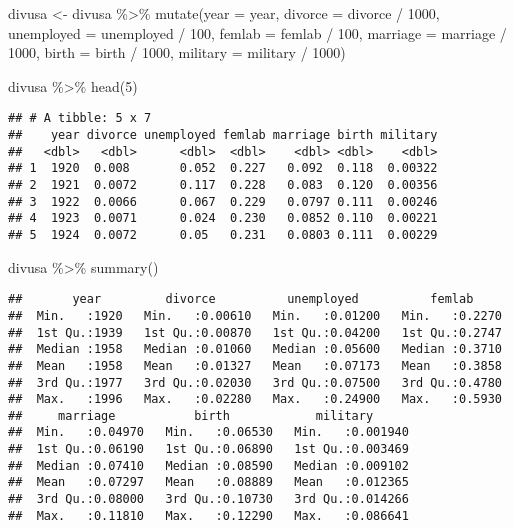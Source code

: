 \documentclass[
]{article}
\newenvironment{Shaded}{\begin{snugshade}}{\end{snugshade}}
\newcommand{\AttributeTok}[1]{\textcolor[rgb]{0.77,0.63,0.00}{#1}}
\newcommand{\DecValTok}[1]{\textcolor[rgb]{0.00,0.00,0.81}{#1}}
\newcommand{\FunctionTok}[1]{\textcolor[rgb]{0.00,0.00,0.00}{#1}}
\newcommand{\NormalTok}[1]{#1}
\newcommand{\OtherTok}[1]{\textcolor[rgb]{0.56,0.35,0.01}{#1}}
\newcommand{\SpecialCharTok}[1]{\textcolor[rgb]{0.00,0.00,0.00}{#1}}
\begin{document}
\begin{Shaded}
\begin{Highlighting}[]
\NormalTok{divusa }\OtherTok{\textless{}{-}}\NormalTok{ divusa }\SpecialCharTok{\%\textgreater{}\%} \FunctionTok{mutate}\NormalTok{(}\AttributeTok{year =}\NormalTok{ year,}
                            \AttributeTok{divorce =}\NormalTok{ divorce }\SpecialCharTok{/} \DecValTok{1000}\NormalTok{,}
                            \AttributeTok{unemployed =}\NormalTok{ unemployed }\SpecialCharTok{/} \DecValTok{100}\NormalTok{,}
                            \AttributeTok{femlab =}\NormalTok{ femlab }\SpecialCharTok{/} \DecValTok{100}\NormalTok{,}
                            \AttributeTok{marriage =}\NormalTok{ marriage }\SpecialCharTok{/} \DecValTok{1000}\NormalTok{,}
                            \AttributeTok{birth =}\NormalTok{ birth }\SpecialCharTok{/} \DecValTok{1000}\NormalTok{,}
                            \AttributeTok{military =}\NormalTok{ military }\SpecialCharTok{/} \DecValTok{1000}\NormalTok{)}

\NormalTok{divusa }\SpecialCharTok{\%\textgreater{}\%} \FunctionTok{head}\NormalTok{(}\DecValTok{5}\NormalTok{)}
\end{Highlighting}
\end{Shaded}

\begin{verbatim}
## # A tibble: 5 x 7
##    year divorce unemployed femlab marriage birth military
##   <dbl>   <dbl>      <dbl>  <dbl>    <dbl> <dbl>    <dbl>
## 1  1920  0.008       0.052  0.227   0.092  0.118  0.00322
## 2  1921  0.0072      0.117  0.228   0.083  0.120  0.00356
## 3  1922  0.0066      0.067  0.229   0.0797 0.111  0.00246
## 4  1923  0.0071      0.024  0.230   0.0852 0.110  0.00221
## 5  1924  0.0072      0.05   0.231   0.0803 0.111  0.00229
\end{verbatim}

\begin{Shaded}
\begin{Highlighting}[]
\NormalTok{divusa }\SpecialCharTok{\%\textgreater{}\%} \FunctionTok{summary}\NormalTok{()}
\end{Highlighting}
\end{Shaded}

\begin{verbatim}
##       year         divorce          unemployed          femlab      
##  Min.   :1920   Min.   :0.00610   Min.   :0.01200   Min.   :0.2270  
##  1st Qu.:1939   1st Qu.:0.00870   1st Qu.:0.04200   1st Qu.:0.2747  
##  Median :1958   Median :0.01060   Median :0.05600   Median :0.3710  
##  Mean   :1958   Mean   :0.01327   Mean   :0.07173   Mean   :0.3858  
##  3rd Qu.:1977   3rd Qu.:0.02030   3rd Qu.:0.07500   3rd Qu.:0.4780  
##  Max.   :1996   Max.   :0.02280   Max.   :0.24900   Max.   :0.5930  
##     marriage           birth            military       
##  Min.   :0.04970   Min.   :0.06530   Min.   :0.001940  
##  1st Qu.:0.06190   1st Qu.:0.06890   1st Qu.:0.003469  
##  Median :0.07410   Median :0.08590   Median :0.009102  
##  Mean   :0.07297   Mean   :0.08889   Mean   :0.012365  
##  3rd Qu.:0.08000   3rd Qu.:0.10730   3rd Qu.:0.014266  
##  Max.   :0.11810   Max.   :0.12290   Max.   :0.086641
\end{verbatim}
\end{document}

